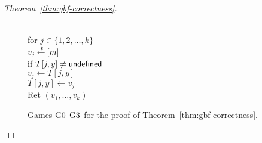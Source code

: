 \begin{proof}[Theorem~\ref{thm:gbf-correctness}]
\begin{figure}[tp]
{{\\
for $j \in \{1,2,\ldots,k\}$\\
\nudge $v_j {\:\stackrel{{\scriptscriptstyle \hspace{0.2em}\$}} {\leftarrow}\:} [m]$\\
\nudge if $T[j,y] \neq \mathsf{undefined}$\\
\nudge \nudge $v_j \gets T[j,y]$\\
\nudge $T[j,y] \gets v_j$\\
Ret $\left(v_1,\ldots,v_k\right)$
}
}
\caption{Games $\text{G0}$-$\text{G3}$ for the
proof of Theorem~\ref{thm:gbf-correctness}.}
\label{fig:gbf-correctness-games1}
\end{figure}
\begin{figure}[tp]
\end{figure}
\end{proof}
